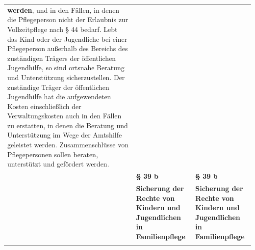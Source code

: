 \documentclass[10pt,a4paper,landscape]{article}
\begin{document}
\begin{longtable}{|L{8.2cm}|L{8.2cm}|L{8.2cm}|}
\textbf{\textcolor{diffgreen}{werden}}\textcolor{diffgreen}{,} und in den Fällen, in  \newline denen die Pflegeperson nicht der Erlaubnis  \newline zur Vollzeitpflege nach \S{} 44 bedarf. Lebt  \newline das Kind oder der Jugendliche bei einer  \newline Pflegeperson außerhalb des Bereichs des  \newline zuständigen Trägers der öffentlichen  \newline Jugendhilfe, so sind ortsnahe Beratung und  \newline Unterstützung sicherzustellen. Der  \newline zuständige Träger der öffentlichen  \newline Jugendhilfe hat die aufgewendeten Kosten  \newline einschließlich der Verwaltungskosten auch  \newline in den Fällen zu erstatten, in denen die  \newline Beratung und Unterstützung im Wege der  \newline Amtshilfe geleistet werden.  \newline Zusammenschlüsse von Pflegepersonen  sollen beraten, unterstützt und gefördert  \newline werden. \\
\hhline{|---|}
 & \textbf{\S{} 39 b} & \textbf{\S{} 39 b} \\
\hhline{|---|}
 & \textbf{Sicherung der Rechte von Kindern und  \newline Jugendlichen in Familienpflege } & \textbf{Sicherung der Rechte von Kindern und  \newline Jugendlichen in Familienpflege } \\
\hhline{|---|}

\end{longtable}
\end{document}
